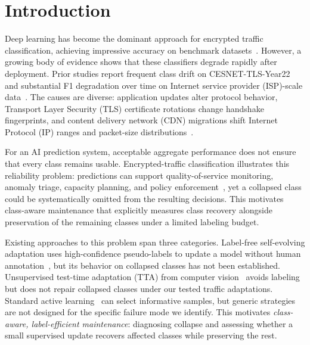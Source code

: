 \documentclass[preprint,12pt,authoryear]{elsarticle}
\let\cite\citep
\begin{document}
\section{Introduction}
\label{sec:intro}

Deep learning has become the dominant approach for encrypted traffic classification, achieving impressive accuracy on benchmark datasets~\cite{lin2022etbert, zhao2023yatc, pacheco2019towards, wang2019survey}.
However, a growing body of evidence shows that these classifiers degrade rapidly after deployment.
Prior studies report frequent class drift on CESNET-TLS-Year22~\cite{soukup2025drift} and substantial F1 degradation over time on Internet service provider (ISP)-scale data~\cite{malekghaini2023drift}.
The causes are diverse: application updates alter protocol behavior, Transport Layer Security (TLS) certificate rotations change handshake fingerprints, and content delivery network (CDN) migrations shift Internet Protocol (IP) ranges and packet-size distributions~\cite{soukup2025drift, lu2019learning, gama2014survey}.

For an AI prediction system, acceptable aggregate performance does not ensure that every class remains usable. Encrypted-traffic classification illustrates this reliability problem: predictions can support quality-of-service monitoring, anomaly triage, capacity planning, and policy enforcement~\cite{rezaei2019deep,pacheco2019towards}, yet a collapsed class could be systematically omitted from the resulting decisions. This motivates class-aware maintenance that explicitly measures class recovery alongside preservation of the remaining classes under a limited labeling budget.

Existing approaches to this problem span three categories.
Label-free self-evolving adaptation uses high-confidence pseudo-labels to update a model without human annotation~\cite{chen2025selfevolving}, but its behavior on collapsed classes has not been established.
Unsupervised test-time adaptation (TTA) from computer vision~\cite{wang2021tent, niu2022eata, niu2023sar} avoids labeling but does not repair collapsed classes under our tested traffic adaptations.
Standard active learning~\cite{settles2009active, sener2018coreset, ash2020badge} can select informative samples, but generic strategies are not designed for the specific failure mode we identify.
This motivates \textit{class-aware, label-efficient maintenance}: diagnosing collapse and assessing whether a small supervised update recovers affected classes while preserving the rest.
\end{document}
